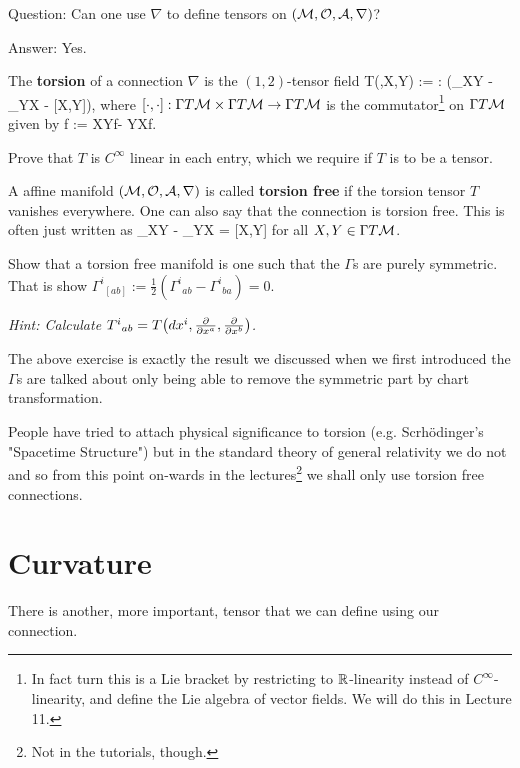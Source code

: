 Question: Can one use $\nabla$ to define tensors on $(\mathcal{M},\mathcal{O},\mathcal{A},\nabla)$? 

Answer: Yes. 

\bd[Torsion]
    The \textbf{torsion} of a connection $\nabla$ is the $(1,2)$-tensor field
    \bse 
        T(\omega,X,Y) :=  \omega : \big(\nabla_XY - \nabla_YX - [X,Y]\big),
    \ese 
    where $[\cdot,\cdot]: \Gamma T\mathcal{M} \times \Gamma T\mathcal{M} \to \Gamma T\mathcal{M}$ is the commutator\footnote{In fact turn this is a Lie bracket by restricting to $\mathbb{R}$-linearity instead of $C^{\infty}$-linearity, and define the Lie algebra of vector fields. We will do this in Lecture 11.} on $\Gamma T\mathcal{M}$ given by 
    \bse 
        [X,Y]\la f \ra := X\big\la Y\la f\ra \big\ra - Y\big\la X\la f\ra \big\ra.
    \ese 
\ed 

\bbox 
    Prove that $T$ is $C^{\infty}$ linear in each entry, which we require if $T$ is to be a tensor.
\ebox 

    A affine manifold $(\mathcal{M},\mathcal{O},\mathcal{A},\nabla)$ is called \textbf{torsion free} if the torsion tensor $T$ vanishes everywhere. One can also say that the connection is torsion free. This is often just written as 
    \bse 
        \nabla_XY - \nabla_YX = [X,Y]
    \ese 
    for all $X,Y\in\Gamma T\mathcal{M}$.
\ed 

\bbox 
    Show that a torsion free manifold is one such that the $\Gamma$s are purely symmetric. That is show ${\Gamma^i}_{[ab]} := \frac{1}{2} ({\Gamma^i}_{ab} - {\Gamma^i}_{ba}) =0$. 
    
    \textit{Hint: Calculate ${T^i}_{ab} = T\big(dx^i,\frac{\partial}{\partial x^a},\frac{\partial}{\partial x^b}\big)$.}
\ebox 

\br 
    The above exercise is exactly the result we discussed when we first introduced the $\Gamma$s are talked about only being able to remove the symmetric part by chart transformation.
\er 

People have tried to attach physical significance to torsion (e.g. Scrh\"{o}dinger's "Spacetime Structure") but in the standard theory of general relativity we do not and so from this point on-wards in the lectures\footnote{Not in the tutorials, though.} we shall only use torsion free connections.

\section{Curvature}

There is another, more important, tensor that we can define using our connection.

